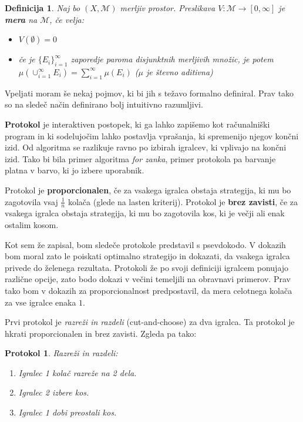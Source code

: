 \documentclass[a4paper, 12pt]{article}
\newtheorem{definicija}{Definicija}
\newtheorem{protokol}{Protokol}
\begin{document}
	\begin{definicija}
		Naj bo $(X, \mathcal{M})$ merljiv prostor. Preslikava $V : \mathcal{M} \to [0, \infty]$ je \textbf{mera} na $\mathcal{M}$, če velja:
		\begin{itemize}
			\item $V(\emptyset) = 0$
			\item če je $\{E_i\}_{i=1}^{\infty}$ zaporedje paroma disjunktnih merljivih množic, je potem $\mu(\cup_{i=1}^{\infty}E_i) = \sum_{i=1}^{\infty} \mu(E_i)$ ($\mu$ je števno aditivna)
		\end{itemize}		
	\end{definicija}

	Vpeljati moram še nekaj pojmov, ki bi jih s težavo formalno definiral. Prav tako so na sledeč način definirano bolj intuitivno razumljivi.
	
	\textbf{Protokol} je interaktiven postopek, ki ga lahko zapišemo kot računalniški program in ki sodelujočim lahko postavlja vprašanja, ki spremenijo njegov končni izid. Od algoritma se razlikuje ravno po izbirah igralcev, ki vplivajo na končni izid. Tako bi bila primer algoritma \textit{for zanka}, primer protokola pa barvanje platna v barvo, ki jo izbere uporabnik.
	
	Protokol je \textbf{proporcionalen}, če za vsakega igralca obstaja strategija, ki mu bo zagotovila vsaj $\frac{1}{n}$ kolača (glede na lasten kriterij). Protokol je \textbf{brez zavisti}, če za vsakega igralca obstaja strategija, ki mu bo zagotovila kos, ki je večji ali enak ostalim kosom. 
	
	Kot sem že zapisal, bom sledeče protokole predstavil s psevdokodo. V dokazih bom moral zato le poiskati optimalno strategijo in dokazati, da vsakega igralca privede do želenega rezultata. Protokoli že po svoji definiciji igralcem ponujajo različne opcije, zato bodo dokazi v večini temeljili na obravnavi primerov. Prav tako bom v dokazih za proporcionalnost predpostavil, da mera celotnega kolača za vse igralce enaka $1$. 
	
	Prvi protokol je \textit{razreži in razdeli} (cut-and-choose) za dva igralca. Ta protokol je hkrati proporcionalen in brez zavisti. Zgleda pa tako:
	
	\begin{protokol} 
		\label{razrezi&razdeli}
		Razreži in razdeli:
		\begin{enumerate}
			
			\item Igralec 1 kolač razreže na 2 dela.
			
			\item Igralec 2 izbere kos.
			
			\item Igralec 1 dobi preostali kos.
			
		\end{enumerate}
	\end{protokol}
	
\end{document}
